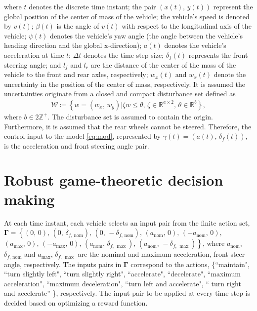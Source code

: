 \documentclass[10pt,journal]{IEEEtran}
\begin{document}
	\noindent where  $t$ denotes the discrete time instant; the pair $\left(x\left(t\right),\,y\left(t\right)\right)$  represent the global position of the center of mass of the vehicle; the vehicle's speed is denoted by $v\left(t\right)$; 	$\beta\left(t\right)$ is the angle of $v\left(t\right)$ with respect to the longitudinal axis of the vehicle; $\psi\left(t\right)$ denotes the vehicle’s yaw angle (the angle between the vehicle’s heading direction and the global x-direction); $a\left(t\right)$ denotes the vehicle’s acceleration at time $t$;  $\Delta t$ denotes the time step size; $\delta_f\left(t\right)$  represents the front steering angle; and  $l_f$  and $l_r$  are the distance of the center of the mass of the vehicle to the front and rear axles, respectively; $w_x\left(t\right)$  and $w_x\left(t\right)$ denote the uncertainty in the position of the center of mass, respectively. It is assumed the uncertainties originate from a closed and compact disturbance set defined as 
	\begin{align}
		{\mathcal{W}} \coloneqq  \left\{ w = \left(w_x,\,w_y\right) |\zeta w\leq\theta,\,\zeta\in\mathbb{R}^{a\times 2},\,\theta\in\mathbb{R}^{b}\right\},
		\label{eq:dist_set}
	\end{align}
	where $b \in 2\mathbb{Z}^{+}$. The disturbance set is assumed to contain the origin. Furthermore, it is assumed that the rear wheels cannot be steered. Therefore, the control input to the model \eqref{eq:mod}, represented by $\gamma\left(t\right) = \left(a\left(t\right),\, \delta_f\left(t\right)\right)$, is the acceleration and front steering angle pair. 

	

	
	\section{Robust game-theoretic decision making}
	\label{sec:controller}

	At each time instant, each vehicle selects an input pair from the finite action set, $ \boldsymbol{\Gamma} = \left\{\left(0,\, 0\right),\,\left(0,\, \delta_{f,\,\textrm{nom}}\right),\,\left(0,\, -\delta_{f,\,\textrm{nom}}\right),\,\left(a_{\textrm{nom}},\, 0\right),\,\left(-a_{\textrm{nom}},\, 0\right),\right.$ $\left.\left(a_{\max},\, 0\right),\,\left(-a_{\max},\, 0\right),\,\left(a_{\textrm{nom}},\, \delta_{f,\,\max}\right),\,\left(a_{\textrm{nom}},\, -\delta_{f,\,\max}\right)\right\}$, where $a_{\textrm{nom}}$, $\delta_{f,\,\textrm{nom}}$ and $a_{\max}$, $\delta_{f,\,\max}$ are the nominal and maximum acceleration, front steer angle, respectively. The inputs pairs in $ \boldsymbol{\Gamma}$ correspond to the actions, \{``maintain", ``turn slightly left", ``turn slightly right", ``accelerate", ``decelerate", ``maximum acceleration", ``maximum deceleration", ``turn left and accelerate", `` turn right and accelerate'' \}, respectively. The input pair to be applied at every time step is decided based on optimizing a reward function.
	
\end{document}
